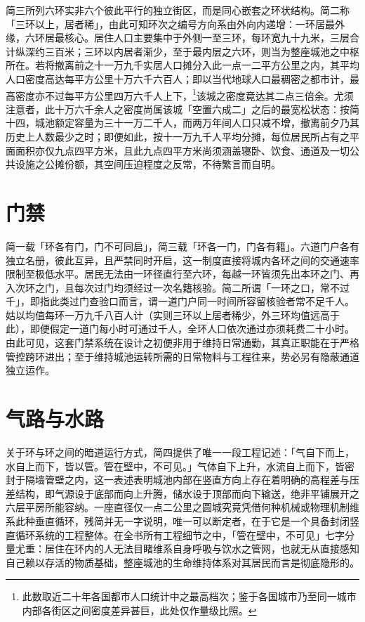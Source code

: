 简三所列六环实非六个彼此平行的独立街区，而是同心嵌套之环状结构。简二称「三环以上，居者稀」，由此可知环次之编号方向系由外向内递增：一环居最外缘，六环居最核心。居住人口主要集中于外侧一至三环，每环宽九十九米，三层合计纵深约三百米；三环以内居者渐少，至于最内层之六环，则当为整座城池之中枢所在。若将撤离前之十一万九千实居人口摊分入此一点一二平方公里之内，其平均人口密度高达每平方公里十万六千六百人；即以当代地球人口最稠密之都市计，最高密度亦不过每平方公里四万六千人上下，\footnote{此数取近二十年各国都市人口统计中之最高档次；鉴于各国城市乃至同一城市内部各街区之间密度差异甚巨，此处仅作量级比照。}该城之密度竟达其二点三倍余。尤须注意者，此十万六千余人之密度尚属该城「空置六成二」之后的最宽松状态：按简十四，城池额定容量为三十一万二千人，而两万年间人口只减不增，撤离前夕乃其历史上人数最少之时；即便如此，按十一万九千人平均分摊，每位居民所占有之平面面积亦仅九点四平方米，且此九点四平方米尚须涵盖寝卧、饮食、通道及一切公共设施之公摊份额，其空间压迫程度之反常，不待繁言而自明。

\section{门禁}

简一载「环各有门，门不可同启」，简三载「环各一门，门各有籍」。六道门户各有独立名册，彼此互异，且严禁同时开启，这一制度直接将城内各环之间的交通速率限制至极低水平。居民无法由一环径直行至六环，每越一环皆须先出本环之门、再入次环之门，且每次过门均须经过一次名籍核验。简二所谓「一环之口，常不过千」，即指此类过门查验口而言，谓一道门户同一时间所容留核验者常不足千人。姑以均值每环一万九千八百人计（实则三环以上居者稀少，外三环均值远高于此），即便假定一道门每小时可通过千人，全环人口依次通过亦须耗费二十小时。由此可见，这套门禁系统在设计之初便非用于维持日常通勤，其真正职能在于严格管控跨环进出；至于维持城池运转所需的日常物料与工程往来，势必另有隐蔽通道独立运作。

\section{气路与水路}

关于环与环之间的暗道运行方式，简四提供了唯一一段工程记述：「气自下而上，水自上而下，皆以管。管在壁中，不可见。」气体自下上升，水流自上而下，皆密封于隔墙管壁之内，这一表述表明城池内部在竖直方向上存在着明确的高程差与压差结构，即气源设于底部而向上升腾，储水设于顶部而向下输送，绝非平铺展开之六层平房所能容纳。一座直径仅一点二公里之圆城究竟凭借何种机械或物理机制维系此种垂直循环，残简并无一字说明，唯一可以断定者，在于它是一个具备封闭竖直循环系统的工程整体。在全书所有工程细节之中，「管在壁中，不可见」七字分量尤重：居住在环内的人无法目睹维系自身呼吸与饮水之管网，也就无从直接感知自己赖以存活的物质基础，整座城池的生命维持体系对其居民而言是彻底隐形的。

